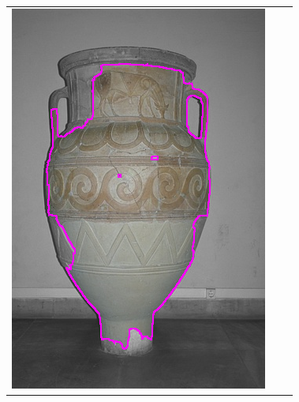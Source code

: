\documentclass[runningheads]{llncs}
\begin{document}
\begin{figure}
\begin{tabular}{ccc}
		\includegraphics[scale=0.2]{images/segmentation/vase/gc-seg.png} &

\end{tabular}
\end{figure}
\end{document}
